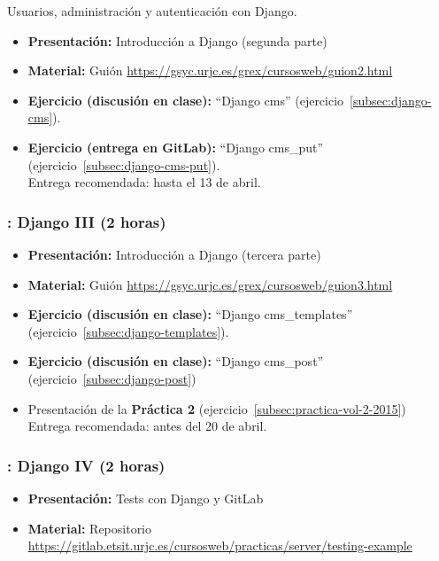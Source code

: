 \documentclass[a4paper,12pt]{article}
\begin{document}
Usuarios, administración y autenticación con Django.

\begin{itemize}
 \item \textbf{Presentación:} Introducción a Django (segunda parte)
  \item \textbf{Material:} Guión \url{https://gsyc.urjc.es/grex/cursosweb/guion2.html}
 \item \textbf{Ejercicio  (discusión en clase):} ``Django cms'' (ejercicio~\ref{subsec:django-cms}). \\
 \item \textbf{Ejercicio (entrega en GitLab):} ``Django cms\_put'' (ejercicio~\ref{subsec:django-cms-put}). \\
  Entrega recomendada: hasta el 13 de abril.
\end{itemize}

\subsubsection{\lunesH: Django III (2 horas)}
\label{cal:lunesH}

\begin{itemize}
 \item \textbf{Presentación:} Introducción a Django (tercera parte)
  \item \textbf{Material:} Guión \url{https://gsyc.urjc.es/grex/cursosweb/guion3.html}
 \item \textbf{Ejercicio (discusión en clase):} ``Django cms\_templates'' (ejercicio~\ref{subsec:django-templates}).
 \item \textbf{Ejercicio (discusión en clase):} ``Django cms\_post'' (ejercicio~\ref{subsec:django-post}) \\
  \item Presentación de la \textbf{Práctica 2} (ejercicio~\ref{subsec:practica-vol-2-2015}) \\
  Entrega recomendada: antes del 20 de abril.
\end{itemize}

\subsubsection{\lunesI: Django IV (2 horas)}
\label{cal:lunesI}

\begin{itemize}
 \item \textbf{Presentación:} Tests con Django y GitLab
  \item \textbf{Material:} Repositorio \url{https://gitlab.etsit.urjc.es/cursosweb/practicas/server/testing-example}
\end{itemize}
\end{document}
